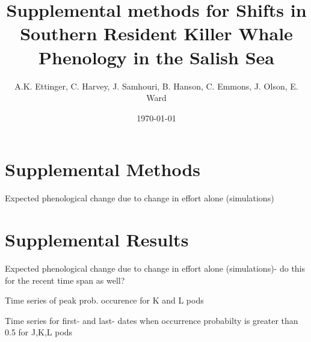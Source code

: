 \documentclass{article}
\begin{document}



\title{Supplemental methods for Shifts in Southern Resident Killer Whale Phenology in the Salish Sea}
\date{\today}
\maketitle
\author{A.K. Ettinger, C. Harvey, J. Samhouri, B. Hanson, C. Emmons, J. Olson, E. Ward}

\section* {Supplemental Methods}
\par Expected phenological change due to change in effort alone (simulations)

\section* {Supplemental Results}
\par Expected phenological change due to change in effort alone (simulations)- do this for the recent time span as well?

\par Time series of peak prob. occurence for K and L pods
\par Time series for first- and last- dates when occurrence probabilty is greater than 0.5 for J,K,L pods
\end{document}
